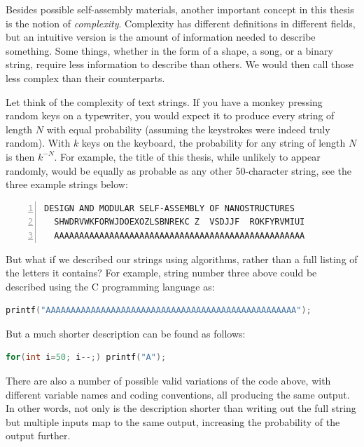 


Besides possible self-assembly materials, another important concept in this thesis is the notion of \emph{complexity}. Complexity has different definitions in different fields, but an intuitive version is the amount of information needed to describe something. Some things, whether in the form of a shape, a song, or a binary string, require less information to describe than others. We would then call those less complex than their counterparts.

Let think of the complexity of text strings. If you have a monkey pressing random keys on a typewriter, you would expect it to produce every string of length \(N\) with equal probability (assuming the keystrokes were indeed truly random). With \(k\) keys on the keyboard, the probability for any string of length \(N\) is then \(k^{-N}\). For example, the title of this thesis, while unlikely to appear randomly, would be equally as probable as any other 50-character string, see the three example strings below:
\begin{lstlisting}[numbers=left]
  DESIGN AND MODULAR SELF-ASSEMBLY OF NANOSTRUCTURES
  SHWDRVWKFORWJDOEXOZLSBNREKC Z  VSDJJF  ROKFYRVMIUI
  AAAAAAAAAAAAAAAAAAAAAAAAAAAAAAAAAAAAAAAAAAAAAAAAAA
\end{lstlisting}

But what if we described our strings using algorithms, rather than a full listing of the letters it contains? For example, string number three above could be described using the C programming language as:

\begin{lstlisting}[language=c]
printf("AAAAAAAAAAAAAAAAAAAAAAAAAAAAAAAAAAAAAAAAAAAAAAAAAA");
\end{lstlisting}

But a much shorter description can be found as follows:

\begin{lstlisting}[language=c]
for(int i=50; i--;) printf("A");
\end{lstlisting}

There are also a number of possible valid variations of the code above, with different variable names and coding conventions, all producing the same output. In other words, not only is the description shorter than writing out the full string but multiple inputs map to the same output, increasing the probability of the output further.

